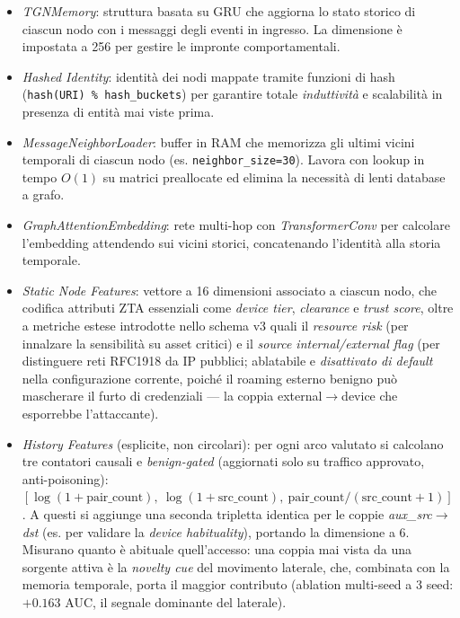 \documentclass[11pt,a4paper]{report}
\begin{document}
\begin{itemize}
    \item \textit{TGNMemory}: struttura basata su GRU che aggiorna lo stato storico di ciascun nodo con i messaggi degli eventi in ingresso. La dimensione è impostata a 256 per gestire le impronte comportamentali.
    \item \textit{Hashed Identity}: identità dei nodi mappate tramite funzioni di hash (\texttt{hash(URI) \% hash\_buckets}) per garantire totale \textit{induttività} e scalabilità in presenza di entità mai viste prima.
    \item \textit{MessageNeighborLoader}: buffer in RAM che memorizza gli ultimi vicini temporali di ciascun nodo (es. \texttt{neighbor\_size=30}). Lavora con lookup in tempo $O(1)$ su matrici preallocate ed elimina la necessità di lenti database a grafo.
    \item \textit{GraphAttentionEmbedding}: rete multi-hop con \textit{TransformerConv} per calcolare l'embedding attendendo sui vicini storici, concatenando l'identità alla storia temporale.
    \item \textit{Static Node Features}: vettore a 16 dimensioni associato a ciascun nodo, che codifica attributi ZTA essenziali come \textit{device tier}, \textit{clearance} e \textit{trust score}, oltre a metriche estese introdotte nello schema v3 quali il \textit{resource risk} (per innalzare la sensibilità su asset critici) e il \textit{source internal/external flag} (per distinguere reti RFC1918 da IP pubblici; ablatabile e \emph{disattivato di default} nella configurazione corrente, poiché il roaming esterno benigno può mascherare il furto di credenziali --- la coppia external$\rightarrow$device che esporrebbe l'attaccante).
    \item \textit{History Features} (esplicite, non circolari): per ogni arco valutato si calcolano tre contatori causali e \textit{benign-gated} (aggiornati solo su traffico approvato, anti-poisoning): $[\log(1{+}\text{pair\_count}),\ \log(1{+}\text{src\_count}),\ \text{pair\_count}/(\text{src\_count}{+}1)]$. A questi si aggiunge una seconda tripletta identica per le coppie \textit{aux\_src}$\rightarrow$\textit{dst} (es. per validare la \textit{device habituality}), portando la dimensione a 6. Misurano quanto è abituale quell'accesso: una coppia mai vista da una sorgente attiva è la \textit{novelty cue} del movimento laterale, che, combinata con la memoria temporale, porta il maggior contributo (ablation multi-seed a 3 seed: $+0.163$ AUC, il segnale dominante del laterale).

\end{itemize}
\end{document}
